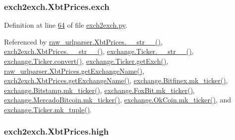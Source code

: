 \subsubsection[{\texorpdfstring{exch}{exch}}]{\setlength{\rightskip}{0pt plus 5cm}exch2exch.\+Xbt\+Prices.\+exch}\hypertarget{classexch2exch_1_1_xbt_prices_a72caf3a29017a1ceaf4367240a46b360}{}\label{classexch2exch_1_1_xbt_prices_a72caf3a29017a1ceaf4367240a46b360}


Definition at line \hyperlink{exch2exch_8py_source_l00064}{64} of file \hyperlink{exch2exch_8py_source}{exch2exch.\+py}.



Referenced by \hyperlink{raw__urlparser_8py_source_l00074}{raw\+\_\+urlparser.\+Xbt\+Prices.\+\_\+\+\_\+str\+\_\+\+\_\+()}, \hyperlink{exch2exch_8py_source_l00091}{exch2exch.\+Xbt\+Prices.\+\_\+\+\_\+str\+\_\+\+\_\+()}, \hyperlink{exchange_8py_source_l00111}{exchange.\+Ticker.\+\_\+\+\_\+str\+\_\+\+\_\+()}, \hyperlink{exchange_8py_source_l00065}{exchange.\+Ticker.\+convert()}, \hyperlink{exchange_8py_source_l00087}{exchange.\+Ticker.\+get\+Exch()}, \hyperlink{raw__urlparser_8py_source_l00068}{raw\+\_\+urlparser.\+Xbt\+Prices.\+get\+Exchange\+Name()}, \hyperlink{exch2exch_8py_source_l00085}{exch2exch.\+Xbt\+Prices.\+get\+Exchange\+Name()}, \hyperlink{exchange_8py_source_l00346}{exchange.\+Bitfinex.\+mk\+\_\+ticker()}, \hyperlink{exchange_8py_source_l00415}{exchange.\+Bitstamp.\+mk\+\_\+ticker()}, \hyperlink{exchange_8py_source_l00474}{exchange.\+Fox\+Bit.\+mk\+\_\+ticker()}, \hyperlink{exchange_8py_source_l00549}{exchange.\+Mercado\+Bitcoin.\+mk\+\_\+ticker()}, \hyperlink{exchange_8py_source_l00614}{exchange.\+Ok\+Coin.\+mk\+\_\+ticker()}, and \hyperlink{exchange_8py_source_l00096}{exchange.\+Ticker.\+mk\+\_\+tuple()}.

\subsubsection[{\texorpdfstring{high}{high}}]{\setlength{\rightskip}{0pt plus 5cm}exch2exch.\+Xbt\+Prices.\+high}\hypertarget{classexch2exch_1_1_xbt_prices_aeae6235417d65d9e9c768a51c38d5388}{}\label{classexch2exch_1_1_xbt_prices_aeae6235417d65d9e9c768a51c38d5388}


